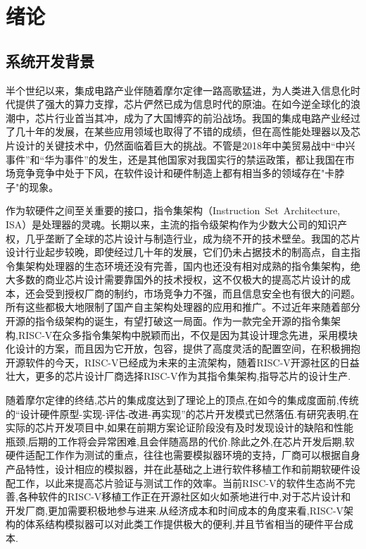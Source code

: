 
\chapter{绪论}

\section{系统开发背景}
半个世纪以来，集成电路产业伴随着摩尔定律一路高歌猛进，为人类进入信息化时代提供了强大的算力支撑，芯片俨然已成为信息时代的原油。在如今逆全球化的浪潮中，芯片行业首当其冲，成为了大国博弈的前沿战场。我国的集成电路产业经过了几十年的发展，在某些应用领域也取得了不错的成绩，但在高性能处理器以及芯片设计的关键技术中，仍然面临着巨大的挑战\cite{huzhenbo,huzhenbo1}。不管是2018年中美贸易战中“中兴事件”和“华为事件”的发生，还是其他国家对我国实行的禁运政策，都让我国在市场竞争竞争中处于下风，在软件设计和硬件制造上都有相当多的领域存在"卡脖子"的现象。


作为软硬件之间至关重要的接口，指令集架构（Instruction Set Architecture, ISA）是处理器的灵魂。长期以来，主流的指令级架构作为少数大公司的知识产权，几乎垄断了全球的芯片设计与制造行业，成为绕不开的技术壁垒。我国的芯片设计行业起步较晚，即使经过几十年的发展，它们仍未占据技术的制高点，自主指令集架构处理器的生态环境还没有完善，国内也还没有相对成熟的指令集架构，绝大多数的商业芯片设计需要靠国外的技术授权，这不仅极大的提高芯片设计的成本，还会受到授权厂商的制约，市场竞争力不强，而且信息安全也有很大的问题。所有这些都极大地限制了国产自主架构处理器的应用和推广。不过近年来随着部分开源的指令级架构的诞生，有望打破这一局面。作为一款完全开源的指令集架构,RISC-V在众多指令集架构中脱颖而出，不仅是因为其设计理念先进，采用模块化设计的方案，而且因为它开放，包容，提供了高度灵活的配置空间，在积极拥抱开源软件的今天，RISC-V已经成为未来的主流架构，随着RISC-V开源社区的日益壮大，更多的芯片设计厂商选择RISC-V作为其指令集架构,指导芯片的设计生产\cite{包云岗2022开源芯片生态技术体系构建面临的机遇与挑战}.

随着摩尔定律的终结,芯片的集成度达到了理论上的顶点,在如今的集成度面前,传统的“设计硬件原型-实现-评估-改进-再实现”的芯片开发模式已然落伍\cite{jichengdu}.有研究表明,在实际的芯片开发项目中,如果在前期方案论证阶段没有及时发现设计的缺陷和性能瓶颈,后期的工作将会异常困难,且会伴随高昂的代价\cite{buzhou}.除此之外,在芯片开发后期,软硬件适配工作作为测试的重点\cite{黄聪会2012软件移植理论与技术研究}，往往也需要模拟器环境的支持\cite{butko2012accuracy}，厂商可以根据自身产品特性，设计相应的模拟器，并在此基础之上进行软件移植工作和前期软硬件设配工作，以此来提高芯片验证与测试工作的效率。当前RISC-V的软件生态尚不完善,各种软件的RISC-V移植工作正在开源社区如火如荼地进行中,对于芯片设计和开发厂商,更加需要积极地参与进来.从经济成本和时间成本的角度来看,RISC-V架构的体系结构模拟器可以对此类工作提供极大的便利,并且节省相当的硬件平台成本.


